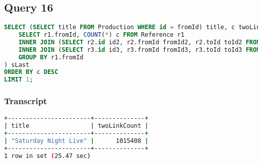 \subsection{Query 16}
\begin{lstlisting}[language=sql]
SELECT (SELECT title FROM Production WHERE id = fromId) title, c twoLinkCount FROM (
	SELECT r1.fromId, COUNT(*) c FROM Reference r1
	INNER JOIN (SELECT r2.id id2, r2.fromId fromId2, r2.toId toId2 FROM Reference r2) s1 ON r1.toId = s1.fromId2
	INNER JOIN (SELECT r3.id id3, r3.fromId fromId3, r3.toId toId3 FROM Reference r3) s2 ON s1.toId2 = s2.fromId3
	GROUP BY r1.fromId
) sLast
ORDER BY c DESC
LIMIT 1;
\end{lstlisting}

\subsubsection{Transcript}
\begin{lstlisting}[language=bash]
+-----------------------+--------------+
| title                 | twoLinkCount |
+-----------------------+--------------+
| "Saturday Night Live" |      1015408 |
+-----------------------+--------------+
1 row in set (25.47 sec)
\end{lstlisting}

